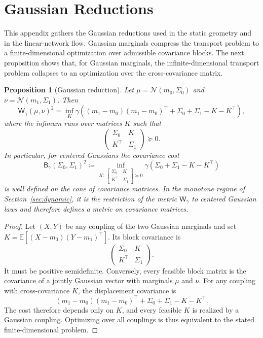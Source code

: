 \documentclass{article}
\newtheorem{proposition}[theorem]{Proposition}
\newcommand{\Wg}{\mathsf{W}_{\gamma}}
\newcommand{\BWg}{\mathsf{B}_{\gamma}}
\begin{document}
\section{Gaussian Reductions}
\label{app:gaussians}
This appendix gathers the Gaussian reductions used in the static geometry and in the linear-network flow.
Gaussian marginals compress the transport problem to a finite-dimensional optimization over admissible covariance blocks.
\medskip
The next proposition shows that, for Gaussian marginals, the infinite-dimensional transport problem collapses to an optimization over the cross-covariance matrix.
\begin{proposition}[Gaussian reduction]
\label{app-thm:gaussian-full}
Let $\mu=\mathcal N(m_0,\Sigma_0)$ and $\nu=\mathcal N(m_1,\Sigma_1)$. Then
$$
\Wg(\mu,\nu)^2
=
\inf_{K}
\gamma\!\left(
(m_1-m_0)(m_1-m_0)^\top
+
\Sigma_0+\Sigma_1-K-K^\top
\right),
$$
where the infimum runs over matrices $K$ such that
$$
\begin{pmatrix}
\Sigma_0 & K \\
K^\top & \Sigma_1
\end{pmatrix}
\succeq 0.
$$
In particular, for centered Gaussians the covariance cost
$$
\BWg(\Sigma_0,\Sigma_1)^2
\coloneqq 
\inf_{K:\,
\left[\begin{smallmatrix}
\Sigma_0 & K\\
K^\top & \Sigma_1
\end{smallmatrix}\right]\succeq 0}
\gamma(\Sigma_0+\Sigma_1-K-K^\top)
$$
is well defined on the cone of covariance matrices. In the monotone regime of Section~\ref{sec:dynamic}, it is the restriction of the metric $\Wg$ to centered Gaussian laws and therefore defines a metric on covariance matrices.
\end{proposition}

\begin{proof}
Let $(X,Y)$ be any coupling of the two Gaussian marginals and set
$K=\mathbb E[(X-m_0)(Y-m_1)^\top]$. Its block covariance is
$$
\begin{pmatrix}
\Sigma_0 & K\\
K^\top & \Sigma_1
\end{pmatrix}.
$$
It must be positive semidefinite. Conversely, every feasible block matrix is
the covariance of a jointly Gaussian vector with marginals $\mu$ and $\nu$.
For any coupling with cross-covariance $K$, the displacement covariance is
$$
(m_1-m_0)(m_1-m_0)^\top+\Sigma_0+\Sigma_1-K-K^\top.
$$
The cost therefore depends only on $K$, and every feasible $K$ is realized by
a Gaussian coupling. Optimizing over all couplings is thus equivalent to the
stated finite-dimensional problem.
\end{proof}
\end{document}
